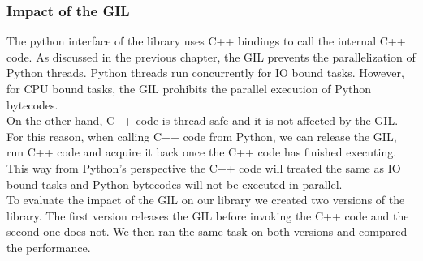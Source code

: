 \begin{spacing}{1.2}
    \subsubsection{Impact of the GIL}
    The python interface of the library uses C++ bindings to call the internal C++ code. As discussed in the previous chapter,
    the GIL prevents the parallelization of Python threads. Python threads run concurrently for IO bound tasks. However,
    for CPU bound tasks, the GIL prohibits the parallel execution of Python bytecodes.\\

    On the other hand, C++ code is thread safe and it is not affected by the GIL. For this reason, when calling C++ code
    from Python, we can release the GIL, run C++ code and acquire it back once the C++ code has finished executing. This way
    from Python's perspective the C++ code will treated the same as IO bound tasks and Python bytecodes will not be executed
    in parallel.\\

    To evaluate the impact of the GIL on our library we created two versions of the library. The first version releases the
    GIL before invoking the C++ code and the second one does not. We then ran the same task on both versions and compared the
    performance.\\


\end{spacing}
